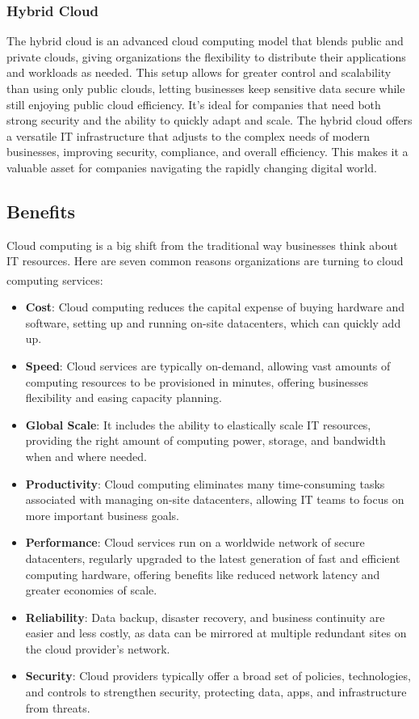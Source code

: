 \subsubsection{Hybrid Cloud}
The hybrid cloud is an advanced cloud computing model that blends public and private clouds, giving
organizations the flexibility to distribute their applications and workloads as needed. This setup
allows for greater control and scalability than using only public clouds, letting businesses keep
sensitive data secure while still enjoying public cloud efficiency. It's ideal for companies that
need both strong security and the ability to quickly adapt and scale. The hybrid cloud offers a
versatile IT infrastructure that adjusts to the complex needs of modern businesses, improving
security, compliance, and overall efficiency. This makes it a valuable asset for companies
navigating the rapidly changing digital world.

\subsection{Benefits}
Cloud computing is a big shift from the traditional way businesses think about IT resources. Here
are seven common reasons organizations are turning to cloud computing services\textsuperscript{\cite{cloud_azure}}:

\begin{itemize}
    \item \textbf{Cost}: Cloud computing reduces the capital expense of buying hardware and
          software, setting up and running on-site datacenters, which can quickly add up.
    \item \textbf{Speed}: Cloud services are typically on-demand, allowing vast amounts of computing
          resources to be provisioned in minutes, offering businesses flexibility and easing capacity
          planning.
    \item \textbf{Global Scale}: It includes the ability to elastically scale IT resources,
          providing the right amount of computing power, storage, and bandwidth when and where needed.
    \item \textbf{Productivity}: Cloud computing eliminates many time-consuming tasks associated
          with managing on-site datacenters, allowing IT teams to focus on more important business goals.
    \item \textbf{Performance}: Cloud services run on a worldwide network of secure datacenters,
          regularly upgraded to the latest generation of fast and efficient computing hardware, offering
          benefits like reduced network latency and greater economies of scale.
    \item \textbf{Reliability}: Data backup, disaster recovery, and business continuity are easier
          and less costly, as data can be mirrored at multiple redundant sites on the cloud provider’s
          network.
    \item \textbf{Security}: Cloud providers typically offer a broad set of policies, technologies,
          and controls to strengthen security, protecting data, apps, and infrastructure from threats.
\end{itemize}

